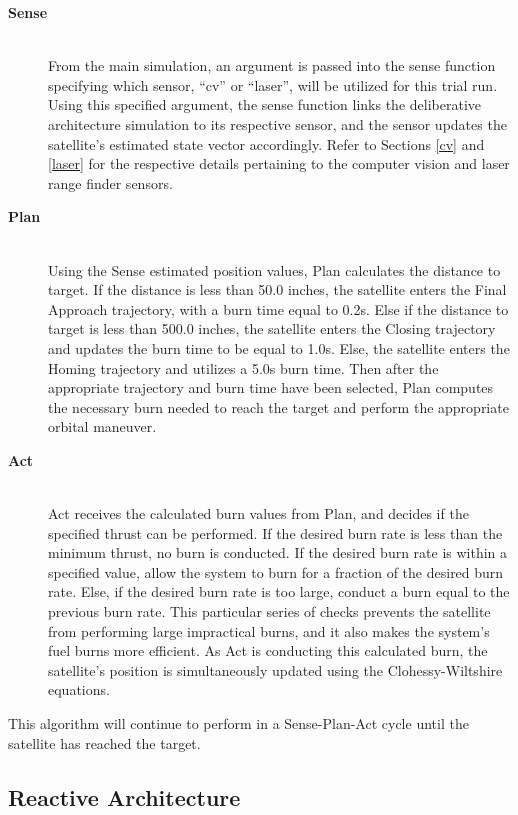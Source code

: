 \documentclass[journal, 10pt]{IEEEtran}
\begin{document}
\begin{description}
\item[\textbf{Sense}] \hfill \\
From the main simulation, an argument is passed into the sense function specifying which sensor, ``cv'' or ``laser'', will be utilized for this trial run. Using this specified argument, the sense function links the deliberative architecture simulation to its respective sensor, and the sensor updates the satellite's estimated state vector accordingly. Refer to Sections \ref{cv} and \ref{laser} for the respective details pertaining to the computer vision and laser range finder sensors.

\item[\textbf{Plan}] \hfill \\
Using the Sense estimated position values, Plan calculates the distance to target. If the distance is less than 50.0 inches, the satellite enters the Final Approach trajectory, with a burn time equal to 0.2s. Else if the distance to target is less than 500.0 inches, the satellite enters the Closing trajectory and updates the burn time to be equal to 1.0s. Else, the satellite enters the Homing trajectory and utilizes a 5.0s burn time. Then after the appropriate trajectory and burn time have been selected, Plan computes the necessary burn needed to reach the target and perform the appropriate orbital maneuver.

\item[\textbf{Act}] \hfill \\
Act receives the calculated burn values from Plan, and decides if the specified thrust can be performed. If the desired burn rate is less than the minimum thrust, no burn is conducted. If the desired burn rate is within a specified value, allow the system to burn for a fraction of the desired burn rate. Else, if the desired burn rate is too large, conduct a burn equal to the previous burn rate. This particular series of checks prevents the satellite from performing large impractical burns, and it also makes the system's fuel burns more efficient. As Act is conducting this calculated burn, the satellite's position is simultaneously updated using the Clohessy-Wiltshire equations. 
\end{description}

This algorithm will continue to perform in a Sense-Plan-Act cycle until the satellite has reached the target.

\subsection{Reactive Architecture}
\end{document}
